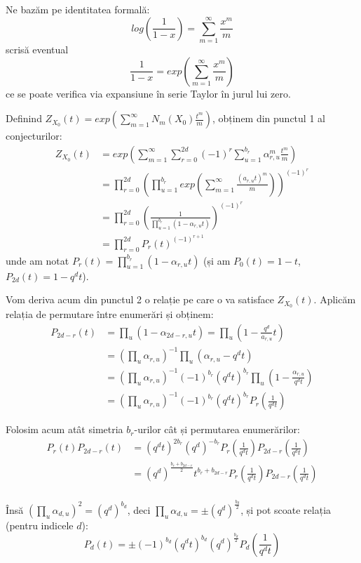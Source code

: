 \documentclass[13pt,openany,oneside]{book}
\begin{document}
Ne bazăm pe identitatea formală:
$$log(\frac{1}{1-x})=\sum\limits_{m=1}^{\infty} \frac{x^m}{m}$$
scrisă eventual
$$\frac{1}{1-x}=exp(\sum\limits_{m=1}^{\infty} \frac{x^m}{m})$$
ce se poate verifica via expansiune în serie Taylor în jurul lui zero.

Definind $Z_{X_0}(t) = exp(\sum\limits_{m=1}^{\infty} N_m(X_0) \frac{t^m}{m})$, obținem din punctul 1 al conjecturilor:
\begin{align*}
Z_{X_0}(t)&=exp(\sum\limits_{m=1}^{\infty} \sum\limits_{r=0}^{2d} (-1)^r \sum\limits_{u=1}^{b_r} \alpha_{r,u}^m \frac{t^m}{m})\\
&=\prod\limits_{r=0}^{2d} (\prod_{u=1}^{b_r} exp(\sum\limits_{m=1}^{\infty} \frac{(a_{r,u} t)^m}{m}))^{(-1)^r}\\
&=\prod\limits_{r=0}^{2d} (\frac{1}{\prod\limits_{u=1}^{b_r}(1-\alpha_{r,u}t)})^{(-1)^r}\\
&=\prod\limits_{r=0}^{2d} P_r(t)^{(-1)^{r+1}}
\end{align*}
unde am notat $P_r(t)=\prod\limits_{u=1}^{b_r}(1-\alpha_{r,u}t)$ (și am $P_0(t)=1-t$, $P_{2d}(t)=1-q^dt$).

Vom deriva acum din punctul 2 o relație pe care o va satisface $Z_{X_0}(t)$. Aplicăm relația de permutare între enumerări și obținem:
\begin{align*}
P_{2d-r}(t)&=\prod_u(1-\alpha_{2d-r,u}t)=\prod_u(1-\frac{q^d}{a_{r,u}}t)\\
&=(\prod_u \alpha_{r,u})^{-1} \prod_u(\alpha_{r,u}-q^dt)\\
&=(\prod_u \alpha_{r,u})^{-1} (-1)^{b_r} (q^dt)^{b_r} \prod_u (1-\frac{\alpha_{r,u}}{q^dt})\\
&=(\prod_u \alpha_{r,u})^{-1} (-1)^{b_r} (q^dt)^{b_r}P_r(\frac{1}{q^dt})
\end{align*}

Folosim acum atât simetria $b_r$-urilor cât și permutarea enumerărilor:
\begin{align*}
P_r(t)P_{2d-r}(t)&=(q^dt)^{2b_r} (q^d)^{-b_r} P_r(\frac{1}{q^dt}) P_{2d-r}(\frac{1}{q^dt})\\
&=(q^d)^{\frac{b_r+b_{2d-r}}{2}} t^{b_r+b_{2d-r}}P_r(\frac{1}{q^dt}) P_{2d-r}(\frac{1}{q^dt})\\
\end{align*}

Însă $(\prod\limits_u \alpha_{d,u})^2=(q^d)^{b_d}$, deci $\prod\limits_u \alpha_{d,u}=\pm (q^d)^{\frac{b_d}{2}}$, și pot scoate relația (pentru indicele $d$):
$$P_d(t)=\pm (-1)^{b_d} (q^dt)^{b_d} (q^d)^{\frac{b_d}{2}} P_d(\frac{1}{q^dt})$$
\end{document}
